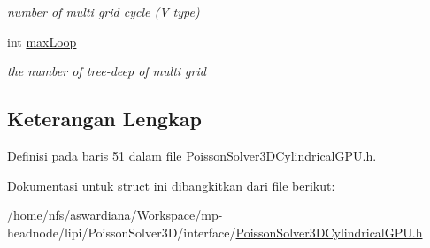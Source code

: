 \begin{DoxyCompactItemize}
\begin{DoxyCompactList}\small\item\em number of multi grid cycle (V type) \end{DoxyCompactList}\item 
\hypertarget{structPoissonSolver3DCylindricalGPU_1_1MGParameters_ace6e6da5f7e18042cd31e8531cada05d}{}\label{structPoissonSolver3DCylindricalGPU_1_1MGParameters_ace6e6da5f7e18042cd31e8531cada05d} 
int \hyperlink{structPoissonSolver3DCylindricalGPU_1_1MGParameters_ace6e6da5f7e18042cd31e8531cada05d}{max\+Loop}
\begin{DoxyCompactList}\small\item\em the number of tree-\/deep of multi grid \end{DoxyCompactList}\end{DoxyCompactItemize}


\subsection{Keterangan Lengkap}


Definisi pada baris 51 dalam file Poisson\+Solver3\+D\+Cylindrical\+G\+P\+U.\+h.



Dokumentasi untuk struct ini dibangkitkan dari file berikut\+:\begin{DoxyCompactItemize}
\item 
/home/nfs/aswardiana/\+Workspace/mp-\/headnode/lipi/\+Poisson\+Solver3\+D/interface/\hyperlink{PoissonSolver3DCylindricalGPU_8h}{Poisson\+Solver3\+D\+Cylindrical\+G\+P\+U.\+h}\end{DoxyCompactItemize}
